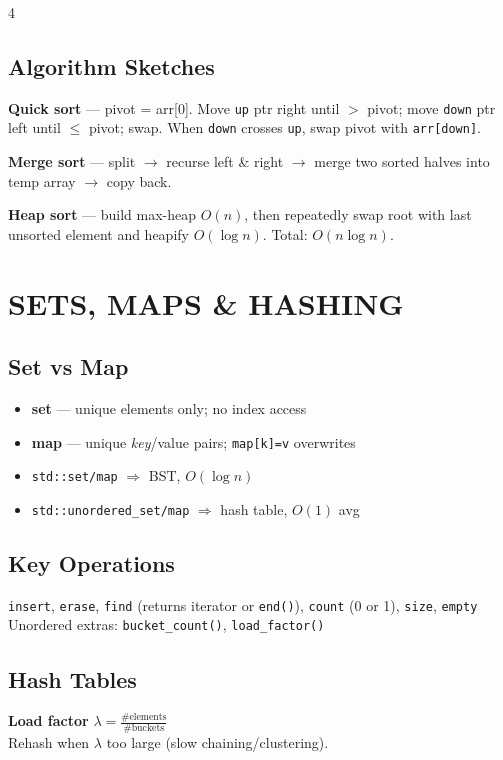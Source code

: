 \documentclass[7pt,landscape]{article}
\newcommand{\On}[1]{\ensuremath{O(#1)}}
\newcommand{\kw}[1]{\textbf{\textcolor{secblue}{#1}}}
\begin{document}
\begin{multicols}{4}
\vspace{2pt}
\subsection{Algorithm Sketches}
\textbf{Quick sort} — pivot = arr[0]. Move \texttt{up} ptr right until $>$ pivot; move \texttt{down} ptr left until $\le$ pivot; swap. When \texttt{down} crosses \texttt{up}, swap pivot with \texttt{arr[down]}.

\textbf{Merge sort} — split $\to$ recurse left \& right $\to$ merge two sorted halves into temp array $\to$ copy back.

\textbf{Heap sort} — build max-heap \On{n}, then repeatedly swap root with last unsorted element and heapify \On{\log n}. Total: \On{n\log n}.

\section{SETS, MAPS \& HASHING}

\subsection{Set vs Map}
\begin{itemize}
  \item \kw{set} — unique elements only; no index access
  \item \kw{map} — unique \textit{key}/value pairs; \texttt{map[k]=v} overwrites
  \item \texttt{std::set/map} $\Rightarrow$ BST, \On{\log n}
  \item \texttt{std::unordered\_set/map} $\Rightarrow$ hash table, \On{1} avg
\end{itemize}

\subsection{Key Operations}
\texttt{insert}, \texttt{erase}, \texttt{find} (returns iterator or \texttt{end()}), \texttt{count} (0 or 1), \texttt{size}, \texttt{empty}\\
Unordered extras: \texttt{bucket\_count()}, \texttt{load\_factor()}

\subsection{Hash Tables}
\textbf{Load factor} $\lambda = \frac{\text{\# elements}}{\text{\# buckets}}$\\
Rehash when $\lambda$ too large (slow chaining/clustering).


\end{multicols}
\end{document}
